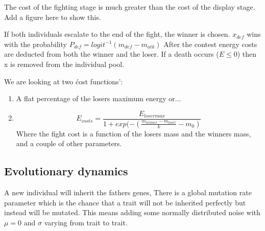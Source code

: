 \documentclass[a4paper,11pt]{article}
\begin{document}
The cost of the fighting stage is much greater than the cost of the display stage. Add a figure here to show this.

If both individuals escalate to the end of the fight, the winner is chosen.  $x_{def}$ wins with the probability $P_{def} = logit^{-1}(m_{def} - m_{atk})$
After the contest energy costs are deducted from both the winner and the loser.
If a death occurs ($E \leq 0$) then x is removed from the individual pool.

We are looking at two \'cost functions':
\begin{enumerate}
    \item A flat percentage of the losers maximum energy or...
    \item $$ E_{costs} = \frac {E_{loser max}} {1 + exp(-(\frac{m_{winner} - m_{loser}}{k} - m_0)}$$ Where the fight cost is a function of the losers mass and the winners mass, and a couple of other parameters.
\end{enumerate}

\clearpage

\subsection{Evolutionary dynamics}

A new individual will inherit the fathers genes,
There is a global mutation rate parameter which is the chance that a trait will not be inherited perfectly but instead will be mutated.
This means adding some normally distributed noise with $\mu = 0$ and $\sigma$ varying from trait to trait.
\end{document}
